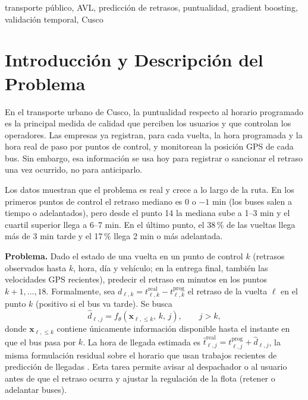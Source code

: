 \documentclass[conference,spanish]{IEEEtran}
\begin{document}
\begin{IEEEkeywords}
transporte público, AVL, predicción de retrasos, puntualidad, gradient boosting, validación temporal, Cusco
\end{IEEEkeywords}

\section{Introducción y Descripción del Problema}

En el transporte urbano de Cusco, la puntualidad respecto al horario programado es la principal medida de calidad que perciben los usuarios y que controlan los operadores. Las empresas ya registran, para cada vuelta, la hora programada y la hora real de paso por puntos de control, y monitorean la posición GPS de cada bus. Sin embargo, esa información se usa hoy para registrar o sancionar el retraso una vez ocurrido, no para anticiparlo.

Los datos muestran que el problema es real y crece a lo largo de la ruta. En los primeros puntos de control el retraso mediano es 0 o $-1$ min (los buses salen a tiempo o adelantados), pero desde el punto 14 la mediana sube a 1--3 min y el cuartil superior llega a 6--7 min. En el último punto, el 38\,\% de las vueltas llega más de 3 min tarde y el 17\,\% llega 2 min o más adelantada.

\textbf{Problema.} Dado el estado de una vuelta en un punto de control $k$ (retrasos observados hasta $k$, hora, día y vehículo; en la entrega final, también las velocidades GPS recientes), predecir el retraso en minutos en los puntos $k{+}1,\dots,18$. Formalmente, sea $d_{\ell,k}=t^{\mathrm{real}}_{\ell,k}-t^{\mathrm{prog}}_{\ell,k}$ el retraso de la vuelta $\ell$ en el punto $k$ (positivo si el bus va tarde). Se busca
\begin{equation}
\hat d_{\ell,j}=f_\theta\!\left(\mathbf x_{\ell,\le k},\, k,\, j\right),\qquad j>k,
\end{equation}
donde $\mathbf x_{\ell,\le k}$ contiene únicamente información disponible hasta el instante en que el bus pasa por $k$. La hora de llegada estimada es $\hat t^{\mathrm{real}}_{\ell,j}=t^{\mathrm{prog}}_{\ell,j}+\hat d_{\ell,j}$, la misma formulación residual sobre el horario que usan trabajos recientes de predicción de llegadas \cite{li2024arrivalnet,hu2022deepreta}. Esta tarea permite avisar al despachador o al usuario antes de que el retraso ocurra y ajustar la regulación de la flota (retener o adelantar buses).
\end{document}
